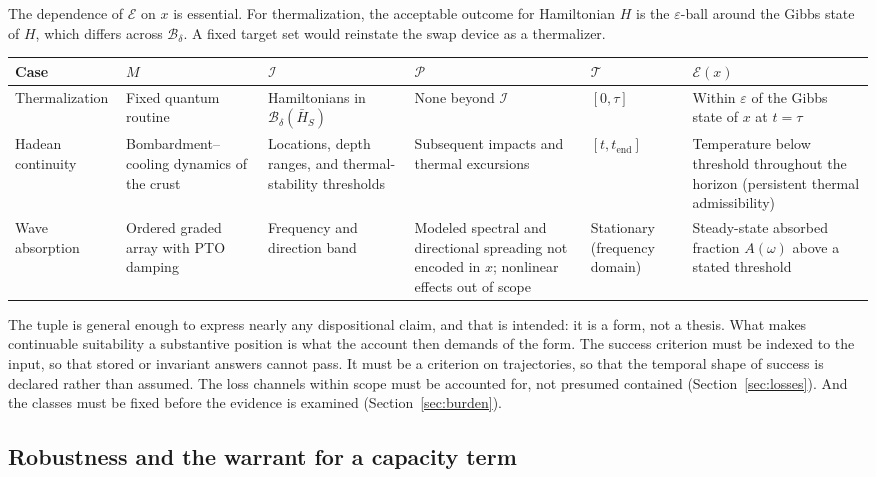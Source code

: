 \documentclass[11pt]{article}
\theoremstyle{definition}
\newcommand{\Iset}{\mathcal I}
\newcommand{\Pset}{\mathcal P}
\newcommand{\Tset}{\mathcal T}
\newcommand{\Eset}{\mathcal E}
\newcommand{\Ball}{\mathcal B}
\begin{document}
The dependence of $\Eset$ on $x$ is essential. For thermalization, the acceptable outcome for Hamiltonian $H$ is the $\varepsilon$-ball around the Gibbs state of $H$, which differs across $\Ball_\delta$. A fixed target set would reinstate the swap device as a thermalizer.

\begin{center}
\footnotesize\setlength{\tabcolsep}{3pt}
\begin{tabular}{@{}>{\raggedright}p{2.1cm}>{\raggedright}p{2.1cm}>{\raggedright}p{2.2cm}>{\raggedright}p{2.5cm}>{\raggedright}p{1.7cm}>{\raggedright\arraybackslash}p{2.2cm}@{}}
\toprule
Case & $M$ & $\Iset$ & $\Pset$ & $\Tset$ & $\Eset(x)$ \\
\midrule
Thermal\-ization & Fixed quantum routine & Hamiltonians in $\Ball_\delta(\bar H_S)$ & None beyond $\Iset$ & $[0,\tau]$ & Within $\varepsilon$ of the Gibbs state of $x$ at $t=\tau$ \\
Hadean continuity & Bombardment--\allowbreak cooling dynamics of the crust & Locations, depth ranges, and thermal-stability thresholds & Subsequent impacts and thermal excursions & $[t,t_{\mathrm{end}}]$ & Temperature below threshold throughout the horizon (persistent thermal admissibility) \\
Wave absorption & Ordered graded array with PTO damping & Frequency and direction band & Modeled spectral and directional spreading not encoded in $x$; nonlinear effects out of scope & Stationary (frequency domain) & Steady-state absorbed fraction $A(\omega)$ above a stated threshold \\
\bottomrule
\end{tabular}
\end{center}

The tuple is general enough to express nearly any dispositional claim, and that is intended: it is a form, not a thesis. What makes continuable suitability a substantive position is what the account then demands of the form. The success criterion must be indexed to the input, so that stored or invariant answers cannot pass. It must be a criterion on trajectories, so that the temporal shape of success is declared rather than assumed. The loss channels within scope must be accounted for, not presumed contained (Section~\ref{sec:losses}). And the classes must be fixed before the evidence is examined (Section~\ref{sec:burden}).

\subsection{Robustness and the warrant for a capacity term}
\end{document}
